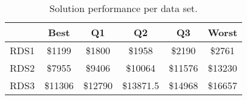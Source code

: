 \begin{table}
\footnotesize
\caption{Solution performance per data set.}
\centering
\begin{tabular}{c||c|c|c|c|c}
\hline \hline
                 & Best                 & Q1                 & Q2                & Q3                & Worst \\ 
\hline
RDS1 & \$1199   & \$1800   & \$1958  & \$2190  & \$2761 \\
\hline
RDS2 & \$7955   & \$9406   & \$10064  & \$11576  & \$13230 \\
\hline
RDS3 & \$11306   & \$12790   & \$13871.5  & \$14968  & \$16657 \\
\end{tabular} 
\label{table:result} 
\end{table}